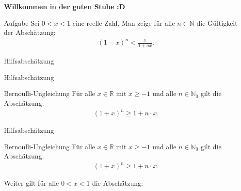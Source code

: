 \documentclass[10pt]{beamer}
\title{}
\author{Artur's \( \oint \) Mathematikstübchen}
\date{}
\def\bN{\mathbb{N}}
\def\bR{\mathbb{R}}
\begin{document}

\begin{frame}
    \begin{center}
        \textbf{\huge Willkommen in der guten Stube \newline \newline :D}
    \end{center}
\end{frame}




\begin{frame}
    \begin{alertblock}{Aufgabe}
        Sei \( 0 < x < 1 \) eine reelle Zahl. Man zeige für alle \( n \in \bN \) die Gültigkeit der Abschätzung:
        \begin{align*}
            \left( 1 - x \right)^{n}
            < \frac{1}{1 + nx}.
        \end{align*}
    \end{alertblock}
\end{frame}



\begin{frame}{Hilfsabschätzung}
    
\end{frame}



\begin{frame}{Hilfsabschätzung}
    \begin{block}{Bernoulli-Ungleichung}
        Für alle \( x \in \bR \) mit \( x \geq - 1 \) und alle \( n \in \bN_{0} \) gilt die Abschätzung:
        \begin{align*}
            \left( 1 + x \right)^{n}
            \geq 1 + n \cdot x.
        \end{align*}
    \end{block}
\end{frame}



\begin{frame}{Hilfsabschätzung}
    \begin{block}{Bernoulli-Ungleichung}
        Für alle \( x \in \bR \) mit \( x \geq - 1 \) und alle \( n \in \bN_{0} \) gilt die Abschätzung:
        \begin{align*}
            \left( 1 + x \right)^{n}
            \geq 1 + n \cdot x.
        \end{align*}
    \end{block}
    Weiter gilt für alle \( 0 < x < 1 \) die Abschätzung:
\end{frame}
\end{document}
